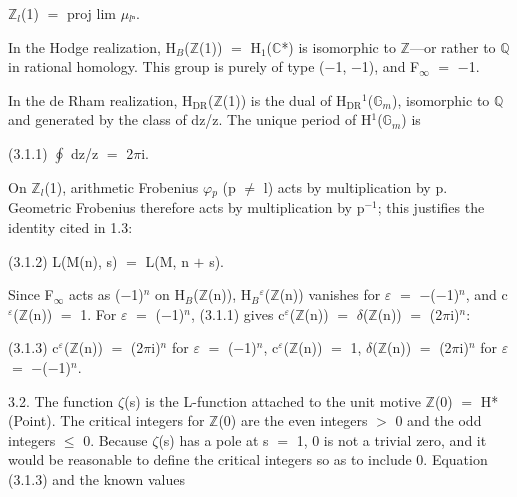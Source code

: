 \documentclass[10pt,twoside]{article}
\begin{document}
\ensuremath{ℤ}\ensuremath{_{l}}(1) \ensuremath{=} proj lim \ensuremath{μ}\ensuremath{_{lⁿ}}.\par
In the Hodge realization, H\ensuremath{_{B}}(\ensuremath{ℤ}(1)) \ensuremath{=} H\ensuremath{_{1}}(\ensuremath{ℂ}*) is isomorphic to \ensuremath{ℤ}—or rather to \ensuremath{ℚ} in rational homology. This group is purely of type (\ensuremath{−}1, \ensuremath{−}1), and F\ensuremath{_{∞}} \ensuremath{=} \ensuremath{−}1.\par
In the de Rham realization, H\ensuremath{_{\mathrm{DR}}}(\ensuremath{ℤ}(1)) is the dual of H\ensuremath{_{\mathrm{DR}}}\ensuremath{^{1}}(\ensuremath{𝔾}\ensuremath{_{m}}), isomorphic to \ensuremath{ℚ} and generated by the class of dz/z. The unique period of H\ensuremath{^{1}}(\ensuremath{𝔾}\ensuremath{_{m}}) is\par
(3.1.1)    \ensuremath{∮} dz/z \ensuremath{=} 2\ensuremath{π}i.\par
On \ensuremath{ℤ}\ensuremath{_{l}}(1), arithmetic Frobenius \ensuremath{φ}\ensuremath{_{p}} (p \ensuremath{≠} l) acts by multiplication by p. Geometric Frobenius therefore acts by multiplication by p\ensuremath{^{-1}}; this justifies the identity cited in 1.3:\par
(3.1.2)    L(M(n), s) \ensuremath{=} L(M, n \ensuremath{+} s).\par
Since F\ensuremath{_{∞}} acts as (\ensuremath{−}1)\ensuremath{^{n}} on H\ensuremath{_{B}}(\ensuremath{ℤ}(n)), H\ensuremath{_{B}}\ensuremath{^{ε}}(\ensuremath{ℤ}(n)) vanishes for \ensuremath{ε} \ensuremath{=} \ensuremath{−}(\ensuremath{−}1)\ensuremath{^{n}}, and c\ensuremath{^{ε}}(\ensuremath{ℤ}(n)) \ensuremath{=} 1. For \ensuremath{ε} \ensuremath{=} (\ensuremath{−}1)\ensuremath{^{n}}, (3.1.1) gives c\ensuremath{^{ε}}(\ensuremath{ℤ}(n)) \ensuremath{=} \ensuremath{δ}(\ensuremath{ℤ}(n)) \ensuremath{=} (2\ensuremath{π}i)\ensuremath{^{n}}:\par
(3.1.3)    c\ensuremath{^{ε}}(\ensuremath{ℤ}(n)) \ensuremath{=} (2\ensuremath{π}i)\ensuremath{^{n}}                 for \ensuremath{ε} \ensuremath{=} (\ensuremath{−}1)\ensuremath{^{n}}, c\ensuremath{^{ε}}(\ensuremath{ℤ}(n)) \ensuremath{=} 1,   \ensuremath{δ}(\ensuremath{ℤ}(n)) \ensuremath{=} (2\ensuremath{π}i)\ensuremath{^{n}}  for \ensuremath{ε} \ensuremath{=} \ensuremath{−}(\ensuremath{−}1)\ensuremath{^{n}}.\par
3.2. The function \ensuremath{ζ}(s) is the L-function attached to the unit motive \ensuremath{ℤ}(0) \ensuremath{=} H*(Point). The critical integers for \ensuremath{ℤ}(0) are the even integers \ensuremath{>} 0 and the odd integers \ensuremath{≤} 0. Because \ensuremath{ζ}(s) has a pole at s \ensuremath{=} 1, 0 is not a trivial zero, and it would be reasonable to define the critical integers so as to include 0. Equation (3.1.3) and the known values\par
\end{document}
